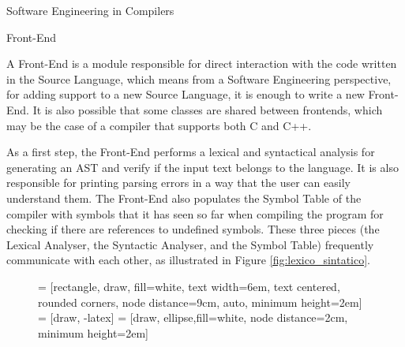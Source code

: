 \begin{section}{Software Engineering in Compilers}
\begin{subsection}{Front-End}

A Front-End is a module responsible for direct interaction with the code
written in the Source Language, which means from a Software Engineering
perspective, for adding support to a new Source Language, it is enough to write
a new Front-End. It is also possible that some classes are shared between
frontends, which may be the case of a compiler that supports both C and C++.



As a first step, the Front-End performs a lexical and syntactical analysis for
generating an AST and verify if the input text belongs to the language. It is
also responsible for printing parsing errors in a way that the user can easily
understand them. The Front-End also populates the Symbol Table of the compiler
with symbols that it has seen so far when compiling the program for checking if
there are references to undefined symbols. These three pieces (the Lexical
Analyser, the Syntactic Analyser, and the Symbol Table) frequently communicate
with each other, as illustrated in Figure \ref{fig:lexico_sintatico}.


\begin{figure}
 = [rectangle, draw, fill=white,
    text width=6em, text centered, rounded corners, node distance=9cm, auto, minimum height=2em]
 = [draw, -latex]
 = [draw, ellipse,fill=white, node distance=2cm,
    minimum height=2em]

\begin{center}
\end{center}
\end{figure}
\end{subsection}
\end{section}
